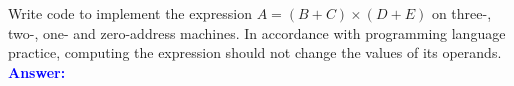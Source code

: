 \item{}
Write code to implement the expression $A=(B+C)\times(D+E)$ on three-, two-,
one- and zero-address machines. In accordance with programming language
practice, computing the expression should not change the values of its
operands.\\[12pt]
\ifanswers
\textcolor{blue}{
\textbf{Answer:}\\
}
\newpage
\fi
